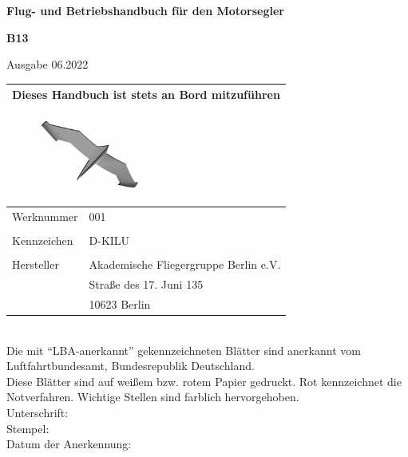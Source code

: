 \documentclass[a5paper,oneside,openany,headings=small]{scrbook}
\begin{document}
\begin{titlepage}
\thispagestyle{empty}
\vspace{2cm}
\begin{center}
\textbf{Flug- und Betriebshandbuch für den Motorsegler}
\end{center}
\begin{center}
\huge{\textbf{B13}}\\
\end{center}
\begin{center}
Ausgabe 06.2022
\end{center}
\begin{center}
\begin{tabular}{|c|}
\hline
Dieses Handbuch ist stets an Bord mitzuführen\\
\hline

\end{tabular}
\end{center}




\begin{figure}[h]
\begin{center}
\includegraphics[width=0.3\textwidth]{charlotte.png}
\end{center}
\end{figure}

\begin{tabular}{l l}
Werknummer & 001\\
 & \\
Kennzeichen & D-KILU\\
 & \\

  Hersteller & Akademische Fliegergruppe Berlin e.V.\\
  & Straße des 17. Juni 135\\
  & 10623 Berlin\\

\end{tabular}\\  
\newline
Die mit "`LBA-anerkannt"' gekennzeichneten Blätter sind anerkannt vom Luftfahrtbundesamt, Bundesrepublik Deutschland.\\
Diese Blätter sind auf weißem bzw. rotem Papier gedruckt. Rot kennzeichnet die Notverfahren. Wichtige Stellen sind farblich hervorgehoben.\\
\newline
Unterschrift:\\
\newline
Stempel:\\
\newline
Datum der Anerkennung:
\end{titlepage}
\newpage
\mbox{} \thispagestyle{empty}
\end{document}
